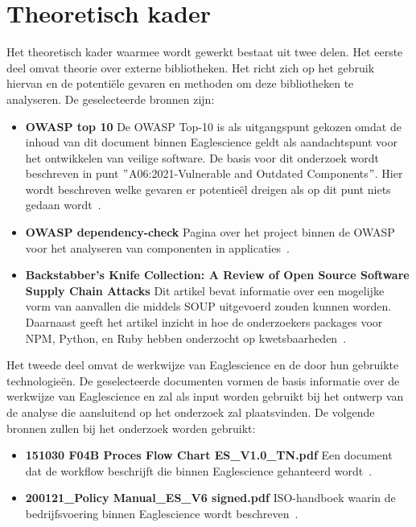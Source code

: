 \section{Theoretisch kader}\label{sec:theoretisch-kader}
Het theoretisch kader waarmee wordt gewerkt bestaat uit twee delen. Het eerste deel omvat theorie over externe bibliotheken. Het richt zich op het gebruik hiervan en de potentiële gevaren en methoden om deze bibliotheken te analyseren. De geselecteerde bronnen zijn:
\begin{itemize}
    \item \textbf{OWASP top 10}
    De OWASP Top-10 is als uitgangspunt gekozen omdat de inhoud van dit document binnen Eaglescience geldt als aandachtspunt voor het ontwikkelen van veilige software. De basis voor dit onderzoek wordt beschreven in punt $"$A06:2021-Vulnerable and Outdated Components$"$. Hier wordt beschreven welke gevaren er potentieël dreigen als op dit punt niets gedaan wordt~\citep{OWASP:2021}.
    \item \textbf{OWASP dependency-check} Pagina over het project binnen de OWASP voor het analyseren van componenten in applicaties~\citep{OWASP:2017}.
    \item \textbf{Backstabber’s Knife Collection: A Review of Open Source Software Supply Chain Attacks} Dit artikel bevat informatie over een mogelijke vorm van aanvallen die middels SOUP uitgevoerd zouden kunnen worden. Daarnaast geeft het artikel inzicht in hoe de onderzoekers packages voor NPM, Python, en Ruby hebben onderzocht op kwetsbaarheden~\citep{Ohm:2020}.
\end{itemize}
Het tweede deel omvat de werkwijze van Eaglescience en de door hun gebruikte technologieën. De geselecteerde documenten vormen de basis informatie over de werkwijze van Eaglescience en zal als input worden gebruikt bij het ontwerp van de analyse die aansluitend op het onderzoek zal plaatsvinden. De volgende bronnen zullen bij het onderzoek worden gebruikt:
\begin{itemize}
    \item \textbf{151030 F04B Proces Flow Chart ES\_V1.0\_TN.pdf} Een document dat de workflow beschrijft die binnen Eaglescience gehanteerd wordt~\citep{Eaglescience:2015}.
    \item \textbf{200121\_Policy Manual\_ES\_V6 signed.pdf} ISO-handboek waarin de bedrijfsvoering binnen Eaglescience wordt beschreven~\citep{Eaglescience:2020}.
\end{itemize}


